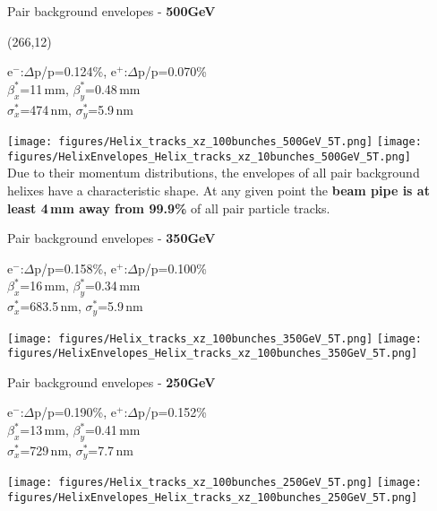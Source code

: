 \documentclass[xcolor={dvipsnames}]{beamer}
\newcommand{\proceedigHelix}{
  \setlength{\TPHorizModule}{1pt}
  \setlength{\TPVertModule}{1pt}
  \begin{textblock}{55}(266,12)
  \centering
  \textblockcolour{SpringGreen}
  \vspace*{0.8mm}{arXiv:\\1703.05737}\vspace*{0.8mm}
  \end{textblock}
}
\newcommand{\electron}{e$^-$}
\newcommand{\positron}{e$^+$}
\begin{document}
\begin{frame}{Pair background envelopes - \textbf{500GeV}}
\proceedigHelix
\begin{center}
\small
\electron:$\Delta$p/p=0.124\%, \positron:$\Delta$p/p=0.070\%\\
$\beta^*_x$=11\,mm, $\beta^*_y$=0.48\,mm\\
$\sigma^*_x$=474\,nm, $\sigma^*_y$=5.9\,nm
\end{center}
\texttt{[image: figures/Helix\_tracks\_xz\_100bunches\_500GeV\_5T.png]}\hspace*{0.1cm}
   \texttt{[image: figures/HelixEnvelopes\_Helix\_tracks\_xz\_10bunches\_500GeV\_5T.png]}\\
Due to their momentum distributions, the envelopes of all pair background helixes have a characteristic shape.
At any given point the \textbf{beam pipe is at least 4\,mm away from 99.9\%} of all pair particle tracks.
\end{frame}
\begin{frame}{Pair background envelopes - \textbf{350GeV}}
\begin{center}
\small
\electron:$\Delta$p/p=0.158\%, \positron:$\Delta$p/p=0.100\%\\
$\beta^*_x$=16\,mm, $\beta^*_y$=0.34\,mm\\
$\sigma^*_x$=683.5\,nm, $\sigma^*_y$=5.9\,nm
\end{center}
   \texttt{[image: figures/Helix\_tracks\_xz\_100bunches\_350GeV\_5T.png]}\hspace*{0.1cm}
   \texttt{[image: figures/HelixEnvelopes\_Helix\_tracks\_xz\_100bunches\_350GeV\_5T.png]}\\
\end{frame}
\begin{frame}{Pair background envelopes - \textbf{250GeV}}
\begin{center}
\small
\electron:$\Delta$p/p=0.190\%, \positron:$\Delta$p/p=0.152\%\\
$\beta^*_x$=13\,mm, $\beta^*_y$=0.41\,mm\\
$\sigma^*_x$=729\,nm, $\sigma^*_y$=7.7\,nm
\end{center}
   \texttt{[image: figures/Helix\_tracks\_xz\_100bunches\_250GeV\_5T.png]}\hspace*{0.1cm}
   \texttt{[image: figures/HelixEnvelopes\_Helix\_tracks\_xz\_100bunches\_250GeV\_5T.png]}\\
\end{frame}
\end{document}
